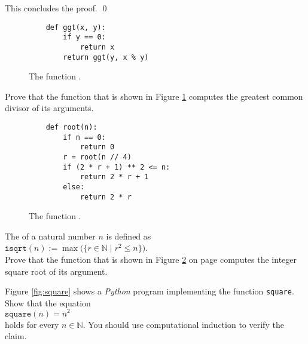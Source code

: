 This concludes the proof. \qed

\begin{figure}[!h]
  \centering
\begin{verbatim}
    def ggt(x, y):
        if y == 0:
            return x
        return ggt(y, x % y)
\end{verbatim}
\vspace*{-0.3cm}
  \caption{The function .}
  \label{fig:gcd}
\end{figure}

\exerciseEng
Prove that the function  that is shown in Figure \ref{fig:gcd} computes the greatest common divisor
of its arguments. \eox

\begin{figure}[!h]
  \centering
\begin{verbatim}
    def root(n):
        if n == 0:
            return 0
        r = root(n // 4)
        if (2 * r + 1) ** 2 <= n:
            return 2 * r + 1
        else:
            return 2 * r
\end{verbatim}
\vspace*{-0.3cm}
  \caption{The function .}
  \label{fig:isqrt}
\end{figure} 

\exerciseEng
The  of a natural number $n$ is defined as 
\\[0.2cm]
\hspace*{1.3cm}
$\texttt{isqrt}(n) := \max\bigl(\{ r \in \mathbb{N} \mid r^2 \leq n \}\bigr)$.
\\[0.2cm]
Prove that the function  that is shown in Figure \ref{fig:isqrt} on page \pageref{fig:isqrt}
computes the integer square root of its argument. \eox
\pagebreak

\exerciseEng
Figure \ref{fig:square} shows a \textsl{Python} program implementing the function \texttt{square}.  Show that the equation
\\[0.2cm]
\hspace*{1.3cm}
$\mathtt{square}(n) = n^2$
\\[0.2cm]
holds for every $n \in \mathbb{N}$.  You should use computational induction to verify the claim. \eox

